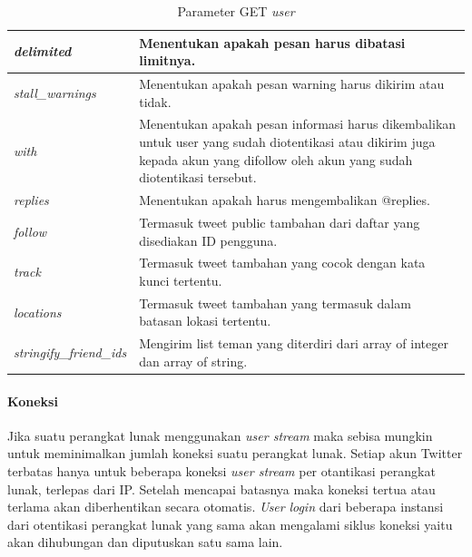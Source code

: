 \begin{table}[h]
\begin{tabular}{|p{5cm}|p{9cm}|}
\hline
\textit{delimited}              & Menentukan apakah pesan harus dibatasi limitnya.																												\\ \hline
\textit{stall\_warnings}        & Menentukan apakah pesan warning harus dikirim atau tidak.                                                               \\ \hline
\textit{with}                   & Menentukan apakah pesan informasi harus dikembalikan untuk user yang sudah diotentikasi atau dikirim juga kepada akun yang difollow oleh akun yang sudah diotentikasi tersebut.\\ \hline
\textit{replies}                & Menentukan apakah harus mengembalikan @replies.                                                                             \\ \hline
\textit{follow}                 & Termasuk tweet public tambahan dari daftar yang disediakan ID pengguna.														\\ \hline
\textit{track}                  & Termasuk tweet tambahan yang cocok dengan kata kunci tertentu.     \\ \hline
\textit{locations}              & Termasuk tweet tambahan yang termasuk dalam batasan lokasi tertentu.                                                      \\ \hline
\textit{stringify\_friend\_ids} & Mengirim list teman yang diterdiri dari array of integer dan array of string.              \\ \hline            
\end{tabular}
\caption{Parameter GET \textit{user}}
\label{table:ParameterGetUser}
\end{table}

\paragraph{Koneksi}
Jika suatu perangkat lunak menggunakan \textit{user stream} maka sebisa mungkin untuk meminimalkan jumlah koneksi suatu perangkat lunak. Setiap akun Twitter terbatas hanya untuk beberapa koneksi \textit{user stream} per otantikasi perangkat lunak, terlepas dari IP. Setelah mencapai batasnya maka koneksi tertua atau terlama akan diberhentikan secara otomatis. \textit{User} \textit{login} dari beberapa instansi dari otentikasi perangkat lunak yang sama akan mengalami siklus koneksi yaitu akan dihubungan dan diputuskan satu sama lain.

